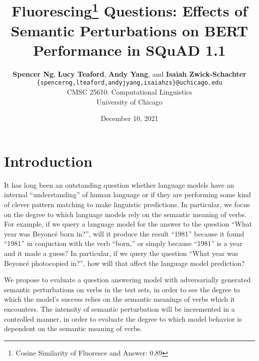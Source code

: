 \documentclass[11pt,a4paper]{article}
\title{Fluorescing\thanks{  Cosine Similarity of Fluoresce and Answer: $0.89$} Questions: Effects of Semantic Perturbations on BERT Performance in SQuAD 1.1}
\author{\normalfont \textbf{Spencer Ng}, \textbf{Lucy Teaford}, \textbf{Andy Yang}, and \textbf{Isaiah Zwick-Schachter} \\
 \texttt{\{spencerng,lteaford,andyjyang,isaiahzs\}@uchicago.edu} \\
 CMSC 25610: Computational Linguistics \\
 University of Chicago}
\date{December 10, 2021}
\begin{document}
\maketitle




\section{Introduction}

It has long been an outstanding question whether language models have an internal ``understanding'' of human language or if they are performing some kind of clever pattern matching to make linguistic predictions. In particular, we focus on the degree to which language models rely on the semantic meaning of verbs. For example, if we query a language model for the answer to the question ``What year was Beyoncé born in?'', will it produce the result ``1981'' because it found ``1981'' in conjuction with the verb ``born,'' or simply because ``1981'' is a year and it made a guess? In particular, if we query the question ``What year was Beyoncé photocopied in?'', how will that affect the language model prediction?

We propose to evaluate a question answering model with adversarially generated semantic perturbations on verbs in the test sets, in order to see the degree to which the model's success relies on the semantic meanings of verbs which it encounters. The intensity of semantic perturbation will be incremented in a controlled manner, in order to evaluate the degree to which model behavior is dependent on the semantic meaning of verbs. 
\end{document}
